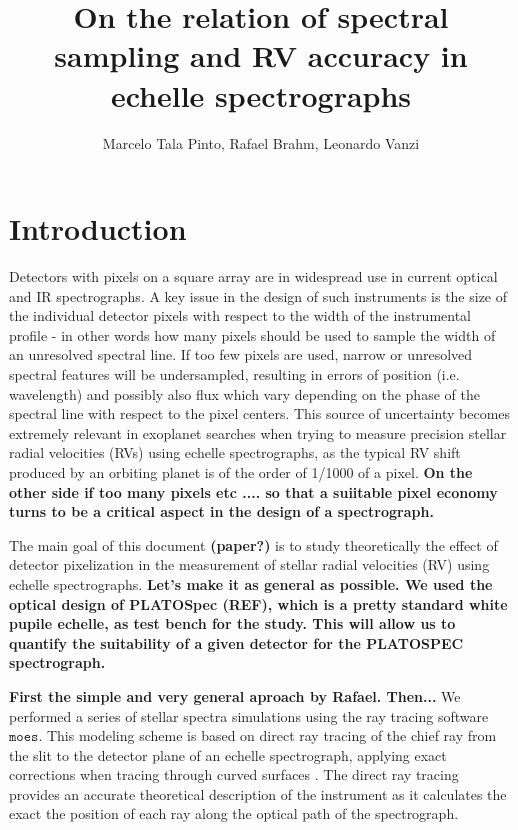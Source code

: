 \documentclass{article}
\begin{document}
\title{On the relation of spectral sampling and RV accuracy in echelle spectrographs}
\author{Marcelo Tala Pinto, Rafael Brahm, Leonardo Vanzi}

\maketitle


\section{Introduction}
Detectors with pixels on a square array are in widespread use in current optical and IR spectrographs. A key issue in the design of such instruments is the size of the individual detector pixels with respect to the width of the instrumental profile - in other words how many pixels should be used to sample the width of an unresolved spectral line. If too few pixels are used, narrow or unresolved spectral features will be undersampled, resulting in errors of position (i.e. wavelength) and possibly also flux which vary depending on the phase of the spectral line with respect to the pixel centers. This source of uncertainty becomes extremely relevant in exoplanet searches when trying to measure precision stellar radial velocities (RVs) using echelle spectrographs, as the typical RV shift produced by an orbiting planet is of the order of 1/1000 of a pixel. {\bf On the other side if too many pixels etc .... so that a suiitable pixel economy turns to be a critical aspect in the design of a spectrograph.}

The main goal of this document {\bf (paper?)} is to study theoretically the effect of detector pixelization in the measurement of stellar radial velocities (RV) using echelle spectrographs. {\bf Let's make it as general as possible. We used the optical design of PLATOSpec (REF), which is a pretty standard white pupile echelle, as test bench for the study. This will allow us to quantify the suitability of a given detector for the PLATOSPEC spectrograph.} 

{\bf First the simple and very general aproach by Rafael. Then... } We performed a series of stellar spectra simulations using the ray tracing software $\texttt{moes}$. This modeling scheme is based on direct ray tracing of the chief ray from the slit to the detector plane of an echelle spectrograph, applying exact corrections when tracing through curved surfaces \cite{moes}. The direct ray tracing provides an accurate theoretical description of the instrument as it calculates the exact the position of each ray along the optical path of the spectrograph.
\end{document}
